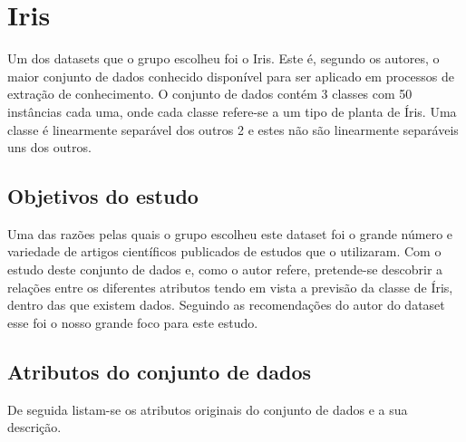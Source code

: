 \section{Iris}\label{sec:Iris}

Um dos datasets que o grupo escolheu foi o Iris. Este é, segundo os autores, o maior conjunto de dados conhecido disponível para ser aplicado em processos de extração de conhecimento. O conjunto de dados contém 3 classes com 50 instâncias cada uma, onde cada classe refere-se a um tipo de planta de Íris. Uma classe é linearmente separável dos outros 2 e estes não são linearmente separáveis uns dos outros.

\subsection{Objetivos do estudo}

Uma das razões pelas quais o grupo escolheu este dataset foi o grande número e variedade de artigos científicos publicados de estudos que o utilizaram. Com o estudo deste conjunto de dados e, como o autor refere, pretende-se descobrir a relações entre os diferentes atributos tendo em vista a previsão da classe de Íris, dentro das que existem dados. Seguindo as recomendações do autor do dataset esse foi o nosso grande foco para este estudo.


\subsection{Atributos do conjunto de dados}

De seguida listam-se os atributos originais do conjunto de dados e a sua descrição.

\begin{table}[]
\centering
{}
\end{table}

